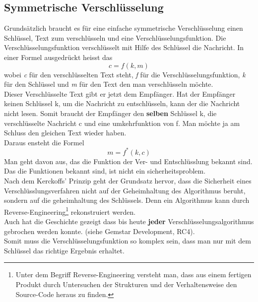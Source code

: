 \subsection{Symmetrische Verschlüsselung}
Grundsätzlich braucht es für eine einfache symmetrische Verschlüsselung einen Schlüssel, Text zum verschlüsseln und eine Verschlüsselungsfunktion.
Die Verschlüsselungsfunktion verschlüsselt mit Hilfe des Schlüssel die Nachricht.
In einer Formel ausgedrückt heisst das
\begin{equation*}
  c = f ( k, m )
\label{eqn:sym_versch}
\end{equation*}
wobei \textit{c} für den verschlüsselten Text steht, \textit{f} für die Verschlüsselungsfunktion, \textit{k} für den Schlüssel und \textit{m} für den Text den man verschlüsseln möchte.\\
%
Dieser Verschlüsselte Text gibt er jetzt dem Empfänger. Hat der Empfänger keinen Schlüssel k, um die Nachricht zu entschlüsseln, kann der die Nachricht nicht lesen. Somit braucht der Empfänger den \textbf{selben} Schlüssel k, die verschlüsselte Nachricht c und eine umkehrfunktion von f. Man möchte ja am Schluss den gleichen Text wieder haben.\\
Daraus ensteht die Formel 
\begin{equation*}
  m = f^*(k ,c)
\label{eqn:sym_entsch}
\end{equation*}
Man geht davon aus, das die Funktion der Ver- und Entschlüsslung bekannt sind. Das die Funktionen bekannt sind, ist nicht ein sicherheitsproblem.\\
Nach dem Kerckoffs' Prinzip geht der Grundsatz hervor, dass die Sicherheit eines Verschlüsslungsverfahren nicht auf der Geheimhaltung des Algorithmus beruht, sondern auf die geheimhaltung des Schlüssels.
Denn ein Algorithmus kann durch Reverse-Engineering\footnote{Unter dem Begriff Reverse-Engineering versteht man, dass aus einem fertigen Produkt durch Untersuchen der Strukturen und der Verhaltensweise den Source-Code heraus zu finden.} rekonstruiert werden.\\
Auch hat die Geschichte gezeigt dass bis heute \textbf{jeder} Verschlüsselungsalgorithmus gebrochen werden konnte. (siehe Gemstar Development, RC4).\\[2ex]
%
Somit muss die Verschlüsselungsfunktion so komplex sein, dass man nur mit dem Schlüssel das richtige Ergebnis erhaltet.
%
